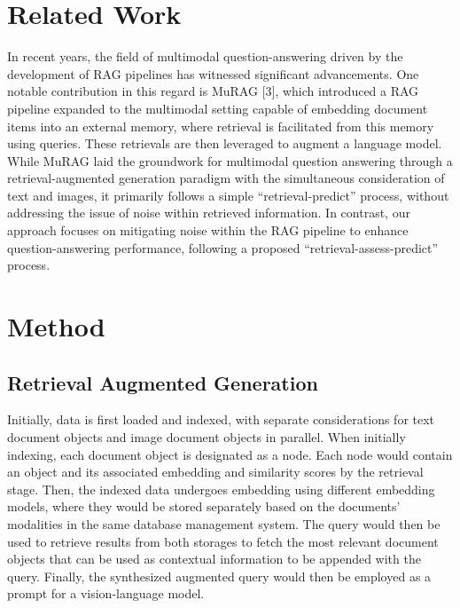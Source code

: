 \documentclass[twocolumn]{article}
\begin{document}
\section{Related Work}
In recent years, the field of multimodal question-answering driven by the development of RAG pipelines has witnessed significant advancements. One notable contribution in this regard is MuRAG [3], which introduced a RAG pipeline expanded to the multimodal setting capable of embedding document items into an external memory, where retrieval is facilitated from this memory using queries. These retrievals are then leveraged to augment a language model. While MuRAG laid the groundwork for multimodal question answering through a retrieval-augmented generation paradigm with the simultaneous consideration of text and images, it primarily follows a simple “retrieval-predict” process, without addressing the issue of noise within retrieved information. In contrast, our approach focuses on mitigating noise within the RAG pipeline to enhance question-answering performance, following a proposed “retrieval-assess-predict” process.

\section{Method}
\subsection{Retrieval Augmented Generation}
Initially, data is first loaded and indexed, with separate considerations for text document objects and image document objects in parallel. When initially indexing, each document object is designated as a node. Each node would contain an object and its associated embedding and similarity scores by the retrieval stage. Then, the indexed data undergoes embedding using different embedding models, where they would be stored separately based on the documents’ modalities in the same database management system. The query would then be used to retrieve results from both storages to fetch the most relevant document objects that can be used as contextual information to be appended with the query. Finally, the synthesized augmented query would then be employed as a prompt for a vision-language model.
\end{document}
